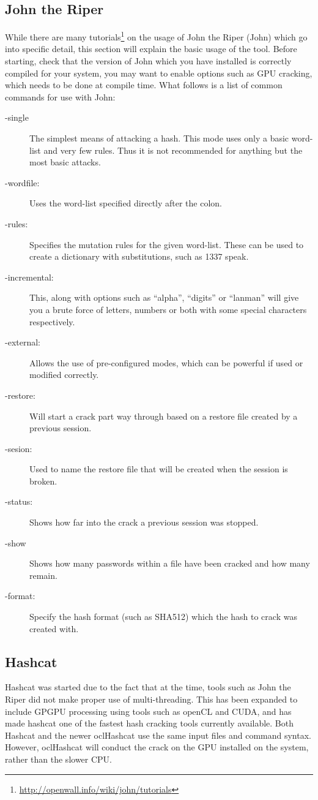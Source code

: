 \documentclass[a4paper,11pt]{report}
\begin{document}
		\subsection{John the Riper}
			While there are many tutorials\footnote{\url{http://openwall.info/wiki/john/tutorials}} on the usage of John the Riper (John) which go into specific detail, this section will explain the basic usage of the tool. 
			Before starting, check that the version of John which you have installed is correctly compiled for your system, you may want to enable options such as GPU cracking, which needs to be done at compile time. 
			What follows is a list of common commands for use with John:
			\begin{description}
				\item[-single]
					The simplest means of attacking a hash. 
					This mode uses only a basic word-list and very few rules. 
					Thus it is not recommended for anything but the most basic attacks. 
				\item[-wordfile:]
					Uses the word-list specified directly after the colon. 
				\item[-rules:]
					Specifies the mutation rules for the given word-list. 
					These can be used to create a dictionary with substitutions, such as 1337 speak. 
				\item[-incremental:]
					This, along with options such as ``alpha'', ``digits'' or ``lanman'' will give you a brute force of letters, numbers or both with some special characters respectively. 
				\item[-external:]
					Allows the use of pre-configured modes, which can be powerful if used or modified correctly. 
				\item[-restore:]
					Will start a crack part way through based on a restore file created by a previous session. 
				\item[-sesion:]
					Used to name the restore file that will be created when the session is broken. 
				\item[-status:]
					Shows how far into the crack a previous session was stopped. 
				\item[-show]
					Shows how many passwords within a file have been cracked and how many remain. 
				\item[-format:]
					Specify the hash format (such as SHA512) which the hash to crack was created with. 
			\end{description}
			
		\subsection{Hashcat}
			Hashcat was started due to the fact that at the time, tools such as John the Riper did not make proper use of multi-threading. 
			This has been expanded to include GPGPU processing using tools such as openCL and CUDA, and has made hashcat one of the fastest hash cracking tools currently available. 
			Both Hashcat and the newer oclHashcat use the same input files and command syntax. 
			However, oclHashcat will conduct the crack on the GPU installed on the system, rather than the slower CPU. 
\end{document}
